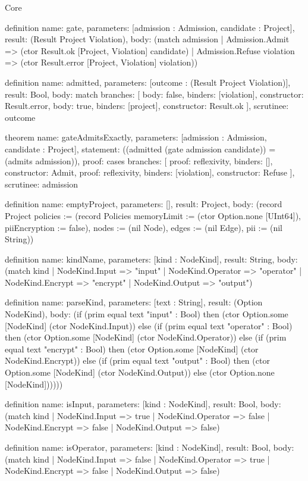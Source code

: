 \begin{lexlean}{Core}
\begin{semanticmodule}
definition{
  name: gate,
  parameters: [admission : Admission, candidate : Project],
  result: (Result Project Violation),
  body: (match admission
    | Admission.Admit => (ctor Result.ok [Project, Violation] candidate)
    | Admission.Refuse violation => (ctor Result.error [Project, Violation] violation))
}

definition{
  name: admitted,
  parameters: [outcome : (Result Project Violation)],
  result: Bool,
  body: match{
    branches: [
      {body: false, binders: [violation], constructor: Result.error},
      {body: true, binders: [project], constructor: Result.ok}
    ],
    scrutinee: outcome
  }
}

theorem{
  name: gateAdmitsExactly,
  parameters: [admission : Admission, candidate : Project],
  statement: ((admitted (gate admission candidate)) = (admits admission)),
  proof: cases{
    branches: [
      {proof: reflexivity{}, binders: [], constructor: Admit},
      {proof: reflexivity{}, binders: [violation], constructor: Refuse}
    ],
    scrutinee: admission
  }
}

definition{
  name: emptyProject,
  parameters: [],
  result: Project,
  body: (record Project {policies := (record Policies {memoryLimit := (ctor Option.none [UInt64]), piiEncryption := false}), nodes := (nil Node), edges := (nil Edge), pii := (nil String)})
}

definition{
  name: kindName,
  parameters: [kind : NodeKind],
  result: String,
  body: (match kind
    | NodeKind.Input => "input"
    | NodeKind.Operator => "operator"
    | NodeKind.Encrypt => "encrypt"
    | NodeKind.Output => "output")
}

definition{
  name: parseKind,
  parameters: [text : String],
  result: (Option NodeKind),
  body: (if (prim equal text "input" : Bool) then (ctor Option.some [NodeKind] (ctor NodeKind.Input)) else (if (prim equal text "operator" : Bool) then (ctor Option.some [NodeKind] (ctor NodeKind.Operator)) else (if (prim equal text "encrypt" : Bool) then (ctor Option.some [NodeKind] (ctor NodeKind.Encrypt)) else (if (prim equal text "output" : Bool) then (ctor Option.some [NodeKind] (ctor NodeKind.Output)) else (ctor Option.none [NodeKind])))))
}

definition{
  name: isInput,
  parameters: [kind : NodeKind],
  result: Bool,
  body: (match kind
    | NodeKind.Input => true
    | NodeKind.Operator => false
    | NodeKind.Encrypt => false
    | NodeKind.Output => false)
}

definition{
  name: isOperator,
  parameters: [kind : NodeKind],
  result: Bool,
  body: (match kind
    | NodeKind.Input => false
    | NodeKind.Operator => true
    | NodeKind.Encrypt => false
    | NodeKind.Output => false)
}


\end{semanticmodule}
\end{lexlean}
